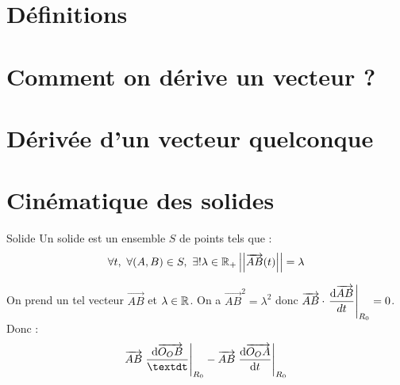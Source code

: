 \documentclass[a4paper,french,bookmarks]{article}
\begin{document}
\initcours

\section{Définitions}


\section{Comment on dérive un vecteur ?}

\section{Dérivée d'un vecteur quelconque}

\section{Cinématique des solides}

\begin{definition}{Solide}
    Un solide est un ensemble $S$ de points tels que :
    \[ \forall t,\ \forall (A, B) \in S,\ \exists! \lambda \in \bdR_+ \mod{\mod{\vec{AB}(t)}} = \lambda \]
\end{definition}

On prend un tel vecteur $\vec{AB}$ et $\lambda \in \bdR$.
On a $\vec{AB}^2 = \lambda^2$ donc $\vec{AB}\cdot\left.\dfrac{\text d\vec{AB}}{dt}\right|_{R_0}=0$. Donc :
\[ \vec{AB}\left.\dfrac{\text d\vec{O_OB}}{\textdt}\right|_{R_0} - \vec{AB}\left.\dfrac{\text d\vec{O_OA}}{\text dt}\right|_{R_0} \]
\end{document}
